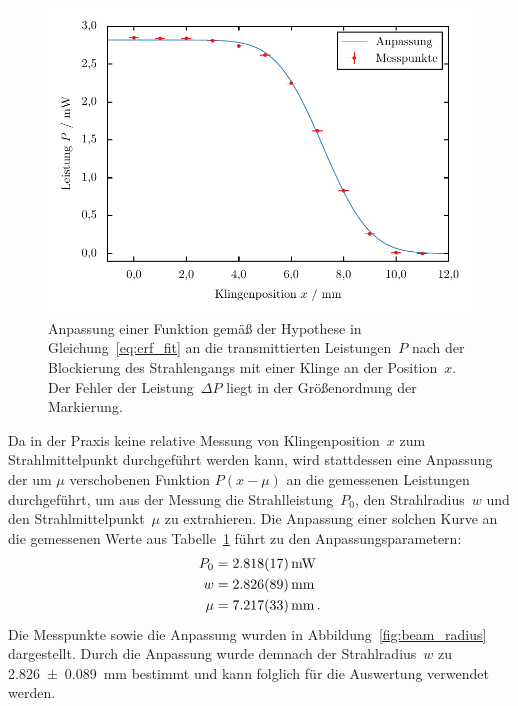 \documentclass[11pt, a4paper]{article}
\numberwithin{equation}{section}
\begin{document}
\begin{figure}
	\centering
	\includegraphics{./figures/beam_radius_fit.pdf}
	\caption{Anpassung einer Funktion gemäß der Hypothese in Gleichung~\eqref{eq:erf_fit} an die transmittierten Leistungen~$P$ nach der Blockierung des Strahlengangs mit einer Klinge an der Position~$x$. Der Fehler der Leistung~$\Delta P$ liegt in der Größenordnung der Markierung.}
	\label{fig:beam_radius}
	
	\vspace{0.5cm}
	
	
	\label{tab:beam_radius}	
\end{figure}

Da in der Praxis keine relative Messung von Klingenposition~$x$ zum Strahlmittelpunkt durchgeführt werden kann, wird stattdessen eine Anpassung der um $\mu$ verschobenen Funktion $P(x-\mu)$ an die gemessenen Leistungen durchgeführt, um aus der Messung die Strahlleistung~$P_0$, den Strahlradius~$w$ und den Strahlmittelpunkt~$\mu$ zu extrahieren.
Die Anpassung einer solchen Kurve an die gemessenen Werte aus Tabelle~\ref{tab:beam_radius} 
führt zu den Anpassungsparametern:
\begin{align*}
	P_0 &= \SI{2.818 +- 0.017}{mW} \\
	w &= \SI{2.826 +- 0.089}{mm} \\
	\mu &= \SI{7.217 +- 0.033}{mm} \, \text{.}
\end{align*}
Die Messpunkte sowie die Anpassung wurden in Abbildung~\ref{fig:beam_radius} dargestellt.
Durch die Anpassung wurde demnach der Strahlradius~$w$ zu \SI{2.826 +- 0.089}{mm} bestimmt und kann folglich für die Auswertung verwendet werden.
\end{document}
